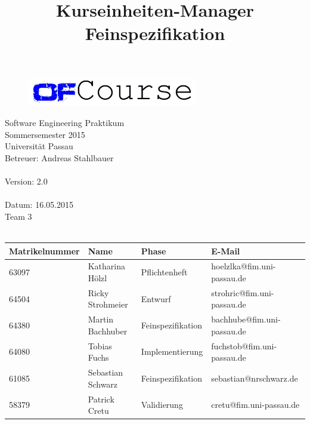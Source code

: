 \documentclass[a4paper, 12pt]{scrreprt}
\begin{document}
	\thispagestyle{plain}

\begin{titlepage}
    \begin{center}
        \begin{figure}[ht]
            \centering
            \includegraphics[width=0.66\textwidth, angle=0]{logo/name_blau_ofCourse.jpg}
        \end{figure}

    	\begin{title}
        	\title{\Huge{\textbf{Kurseinheiten-Manager \\ Feinspezifikation\\}}}

		\end{title}
		\hspace{3cm}

        	Software Engineering Praktikum \\
        	Sommersemester 2015\\
        	Universität Passau\\


        	Betreuer: Andreas Stahlbauer \\
        	\hspace{1,5cm}\\
        	Version: 2.0 \\
        	\hspace{1,5cm}\\
        	Datum: 16.05.2015\\[50pt]
        	Team 3 \\
    
		    \ \\
        
        \begin{tabular}{ | l | l | l | l |}
        	\hline
        	\textbf{Matrikelnummer} & \textbf{Name} & \textbf{Phase} & \textbf{E-Mail}  \\ \hline
        	63097 & Katharina Hölzl & Pflichtenheft & hoelzlka@fim.uni-passau.de \\ \hline
        	64504 & Ricky Strohmeier& Entwurf & strohric@fim.uni-passau.de  \\ \hline
        	64380 & Martin Bachhuber & Feinspezifikation  & bachhube@fim.uni-passau.de \\ \hline
        	64080 & Tobias Fuchs & Implementierung  &  fuchstob@fim.uni-passau.de\\ \hline
        	61085 & Sebastian Schwarz & Feinspezifikation & sebastian@nrschwarz.de \\ \hline  
        	58379 & Patrick Cretu  &  Validierung & cretu@fim.uni-passau.de \\ \hline
        \end{tabular}
        

\end{center}
\end{titlepage}
\end{document}
